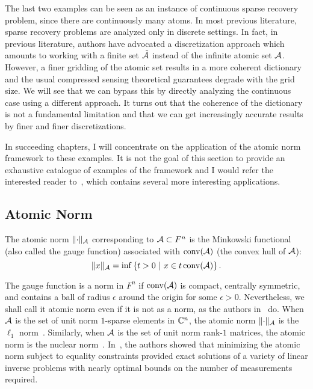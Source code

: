 The last two examples can be seen as an instance of continuous sparse recovery
problem, since there are continuously many atoms. In most previous literature,
sparse recovery problems are analyzed only in discrete settings. In fact, in
previous literature, authors have advocated a discretization approach which
amounts to working with a finite set $\tilde{\mathcal{A}}$ instead of the infinite atomic
set $\mathcal{A}$. However, a finer gridding of the atomic set results in a more coherent
dictionary and the usual compressed sensing theoretical guarantees degrade with
the grid size. We will see that we can bypass this by directly analyzing the
continuous case using a different approach. It turns out that the coherence of
the dictionary is not a fundamental limitation and that we can get increasingly
accurate results by finer and finer discretizations.

In succeeding chapters, I will concentrate on the application of the atomic norm
framework to these examples. It is not the goal of this section to provide an
exhaustive catalogue of examples of the framework and I would refer the
interested reader to~\cite{crpw}, which contains several more interesting
applications.

\subsection{Atomic Norm}

\begin{definition}
The atomic norm $\lVert\cdot\rVert_{\mathcal{A}}$ corresponding to $\mathcal{A} \subset F^n$ is the
Minkowski functional (also called the gauge function) associated with
$\operatorname{conv}(\mathcal{A})$ (the convex hull of $\mathcal{A}$):
\begin{equation}
	\label{defatnorm} \lVert x\rVert_{\mathcal{A}} = \inf\left\{t > 0 ~\middle|~ x \in t \operatorname{conv}(\mathcal{A}) \right\}. 
\end{equation}
\end{definition}

The gauge function is a norm in $F^n$ if $\operatorname{conv}(\mathcal{A})$ is compact, centrally
symmetric, and contains a ball of radius $\epsilon$ around the origin for some
$\epsilon>0$. Nevertheless, we shall call it atomic norm even if it is not as a
norm, as the authors in~\cite{crpw} do. When $\mathcal{A}$ is the set of unit norm
$1$-sparse elements in $\mathbb{C}^n$, the atomic norm $\lVert\cdot\rVert_{\mathcal{A}}$ is the
$\ell_1$ norm~\cite{candes06}. Similarly, when $\mathcal{A}$ is the set of unit norm
rank-$1$ matrices, the atomic norm is the nuclear norm~\cite{Recht10}.
In~\cite{crpw}, the authors showed that minimizing the atomic norm subject to
equality constraints provided exact solutions of a variety of linear inverse
problems with nearly optimal bounds on the number of measurements required.

